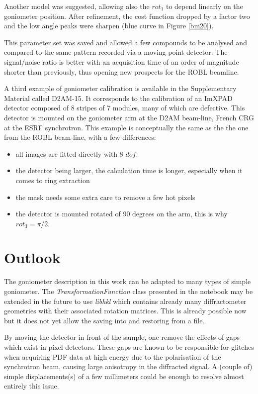 \documentclass[preprint, pdf]{iucr}              %
\begin{document}
Another model was suggested, allowing also the $rot_1$ to depend linearly on the
goniometer position. 
After refinement, the cost function dropped by a factor two and
the low angle peaks were sharpen (blue curve in Figure \ref{bm20}). 

This parameter set was saved and allowed a few compounds to be analysed and
compared to the same pattern recorded via a moving point detector. 
The signal/noise ratio is better with an acquisition time of an order
of magnitude shorter than previously, thus opening new prospects for
the ROBL beamline.

A third example of goniometer calibration is available in the Supplementary
Material called D2AM-15. It corresponds to the calibration of an ImXPAD detector
composed of 8 stripes of 7 modules, many of which are defective.
This detector is mounted on the goniometer arm at the D2AM beam-line, French CRG
at the ESRF synchrotron. 
This example is conceptually the same as the the one from the ROBL beam-line,
with a few differences:
\begin{itemize}
  \item all images are fitted directly with 8 $dof$.
  \item the detector being larger, the calculation time is
        longer, especially when it comes to ring extraction
  \item the mask needs some extra care to remove a few hot pixels
  \item the detector is mounted rotated of 90 degrees on the arm, this is why
  $rot_3=\pi/2$.
\end{itemize}

\section{Outlook}

The goniometer description in this work can be adapted to
many types of simple goniometer.
The \textit{TransformationFunction} class presented in the notebook may be extended
in the future to use \textit{libhkl} \cite{libhkl} which contains already many
diffractometer geometries with their associated rotation matrices. 
This is already possible now but it does not yet allow the saving into and
restoring from a file. 

By moving the detector in front of the sample, one remove the effects of
gaps which exist in pixel detectors.
These gaps are known to be responsible for glitches
when acquiring PDF data at high energy due to the
polarisation of the synchrotron beam, causing large anisotropy in the
diffracted signal. 
A (couple of) simple displacements(s) of a few millimeters could be enough
to resolve almost entirely this issue.
\end{document}
